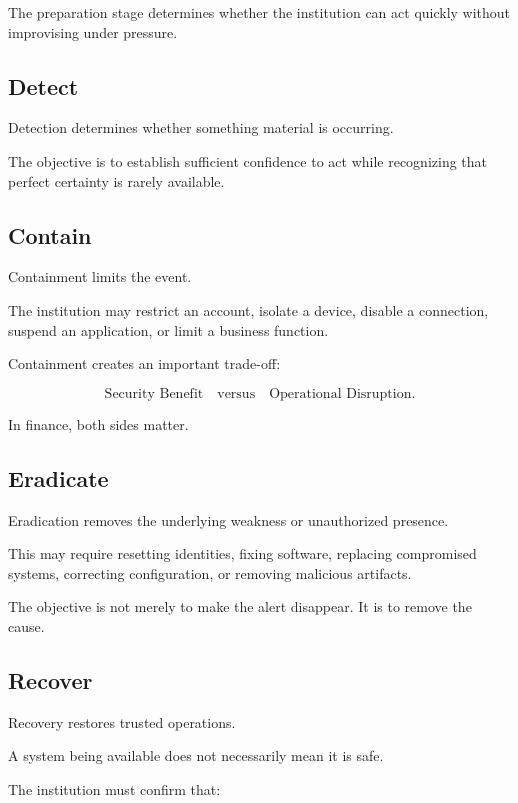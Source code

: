 The preparation stage determines whether the institution can act quickly without improvising under pressure.

\subsection{Detect}

Detection determines whether something material is occurring.

The objective is to establish sufficient confidence to act while recognizing that perfect certainty is rarely available.

\subsection{Contain}

Containment limits the event.

The institution may restrict an account, isolate a device, disable a connection, suspend an application, or limit a business function.

Containment creates an important trade-off:

\begin{equation}
\text{Security Benefit}
\quad \text{versus} \quad
\text{Operational Disruption}.
\end{equation}

In finance, both sides matter.

\subsection{Eradicate}

Eradication removes the underlying weakness or unauthorized presence.

This may require resetting identities, fixing software, replacing compromised systems, correcting configuration, or removing malicious artifacts.

The objective is not merely to make the alert disappear. It is to remove the cause.

\subsection{Recover}

Recovery restores trusted operations.

A system being available does not necessarily mean it is safe.

The institution must confirm that:

